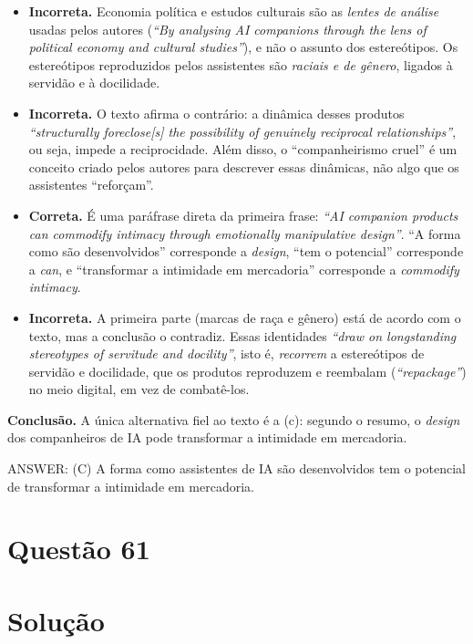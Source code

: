 \documentclass{article}%
\begin{document}
\begin{itemize}
\item[a)] \textbf{Incorreta.} Economia política e estudos culturais são as \emph{lentes de análise} usadas pelos autores (\emph{``By analysing AI companions through the lens of political economy and cultural studies''}), e não o assunto dos estereótipos. Os estereótipos reproduzidos pelos assistentes são \emph{raciais e de gênero}, ligados à servidão e à docilidade.

\item[b)] \textbf{Incorreta.} O texto afirma o contrário: a dinâmica desses produtos \emph{``structurally foreclose[s] the possibility of genuinely reciprocal relationships''}, ou seja, impede a reciprocidade. Além disso, o ``companheirismo cruel'' é um conceito criado pelos autores para descrever essas dinâmicas, não algo que os assistentes ``reforçam''.

\item[c)] \textbf{Correta.} É uma paráfrase direta da primeira frase: \emph{``AI companion products can commodify intimacy through emotionally manipulative design''}. ``A forma como são desenvolvidos'' corresponde a \emph{design}, ``tem o potencial'' corresponde a \emph{can}, e ``transformar a intimidade em mercadoria'' corresponde a \emph{commodify intimacy}.

\item[d)] \textbf{Incorreta.} A primeira parte (marcas de raça e gênero) está de acordo com o texto, mas a conclusão o contradiz. Essas identidades \emph{``draw on longstanding stereotypes of servitude and docility''}, isto é, \emph{recorrem} a estereótipos de servidão e docilidade, que os produtos reproduzem e reembalam (\emph{``repackage''}) no meio digital, em vez de combatê-los.
\end{itemize}

\textbf{Conclusão.} A única alternativa fiel ao texto é a (c): segundo o resumo, o \emph{design} dos companheiros de IA pode transformar a intimidade em mercadoria.

\medskip
ANSWER: (C) A forma como assistentes de IA são desenvolvidos tem o potencial de transformar a intimidade em mercadoria.%
\newpage%
\section*{Questão 61}

\section*{Solução}
\end{document}
